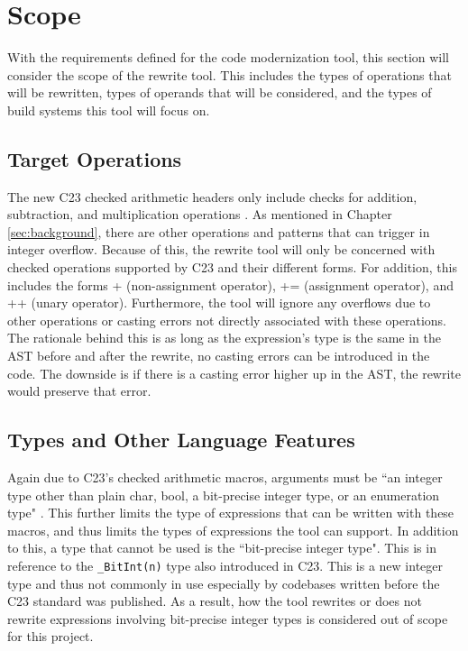 \section{Scope}
\label{subsec:scope}

With the requirements defined for the code modernization tool, this section will consider the scope of the rewrite tool. This includes the types of operations that will be rewritten, types of operands that will be considered, and the types of build systems this tool will focus on.

\subsection{Target Operations}

The new C23 checked arithmetic headers only include checks for addition, subtraction, and multiplication operations \cite{ckd_arith}. As mentioned in Chapter \ref{sec:background}, there are other operations and patterns that can trigger in integer overflow. Because of this, the rewrite tool will only be concerned with checked operations supported by C23 and their different forms. For addition, this includes the forms + (non-assignment operator), += (assignment operator), and ++ (unary operator). Furthermore, the tool will ignore any overflows due to other operations or casting errors not directly associated with these operations. The rationale behind this is as long as the expression's type is the same in the AST before and after the rewrite, no casting errors can be introduced in the code. The downside is if there is a casting error higher up in the AST, the rewrite would preserve that error.

\subsection{Types and Other Language Features}

Again due to C23's checked arithmetic macros, arguments must be ``an integer type other than plain char, bool, a bit-precise integer type, or an enumeration type" \cite{ckd_arith}. This further limits the type of expressions that can be written with these macros, and thus limits the types of expressions the tool can support. In addition to this, a type that cannot be used is the ``bit-precise integer type". This is in reference to the \texttt{\_BitInt(n)} type also introduced in C23. This is a new integer type and thus not commonly in use especially by codebases written before the C23 standard was published. As a result, how the tool rewrites or does not rewrite expressions involving bit-precise integer types is considered out of scope for this project.

